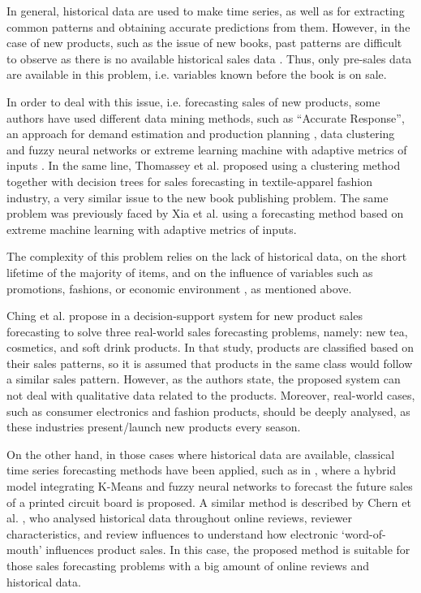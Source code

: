 \documentclass[a4paper,10pt,twocolumn,preprint,3p]{elsarticle}
\begin{document}
In general, historical data are used to make time series, as well as for extracting common patterns and obtaining accurate predictions from them.
However, in the case of new products, such as the issue of new books, past patterns are difficult to observe as there is no available historical sales data 
\cite{ChingChin2010}. Thus, only pre-sales data are available in this problem, i.e. variables known before the book is on sale.

In order to deal with this issue, i.e. forecasting sales of new products, some authors have used different data mining methods, such as 
``Accurate Response'', an approach for demand estimation and production planning \cite{Hammond1990}, 
data clustering and fuzzy neural networks \cite{Chang2009} or 
extreme learning machine with adaptive metrics of inputs \cite{Xia2012}. 
%
In the same line, Thomassey et al. \cite{SThomassey2014} proposed using a 
clustering method together with decision trees for sales forecasting in 
textile-apparel fashion industry, a very similar issue to the new book 
publishing problem.
The same problem was previously faced by Xia et al. \cite{Xia2012} using a 
forecasting method based on extreme machine learning with adaptive metrics of inputs.

The complexity of this problem relies on the lack of historical data, on the 
short lifetime of the majority of items, and on the influence of variables such 
as promotions, fashions, or economic environment
 \cite{Thomassey2012,Xia2012,SThomassey2014}, as mentioned above.

Ching et al. propose in \cite{ChingChin2010} a decision-support system for new 
product sales forecasting to solve three real-world sales forecasting 
problems, namely: new tea, cosmetics, and soft drink products. 
In that study, products are classified based on their sales patterns, so it is 
assumed that products in the same class would follow a similar sales pattern. 
However, as the authors state, the proposed system can not deal with qualitative 
data related to the products. Moreover, real-world cases, such as consumer 
electronics and fashion products, should be deeply analysed, as these industries 
present/launch new products every season. 

On the other hand, in those cases where historical data are available, classical time series forecasting methods have been applied, such as in \cite{Chang2009}, 
where a hybrid model integrating K-Means and fuzzy neural networks to forecast 
the future sales of a printed circuit board is proposed.
A similar method is described by Chern et al. \cite{ChernWSF15}, who analysed 
historical data throughout online reviews, reviewer characteristics, and review 
influences to understand how electronic `word-of-mouth' influences product sales. 
In this case, the proposed method is suitable for those sales forecasting problems with a big amount of online reviews and historical data.
\end{document}
